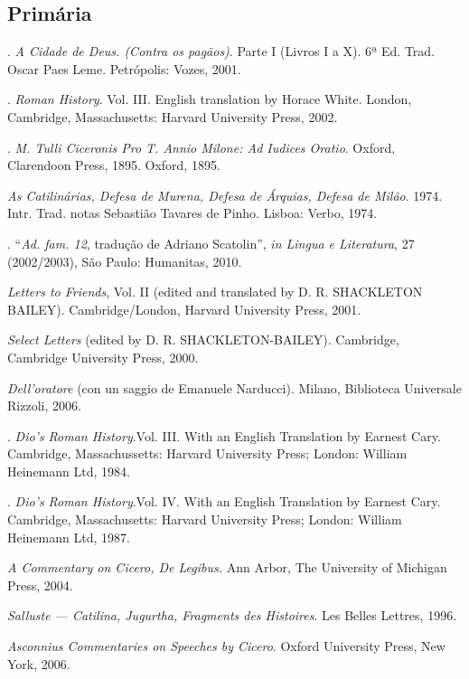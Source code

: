 \begin{bibliohedra}

\section{Primária}

. \emph{A Cidade de Deus. (Contra os pagãos)}. Parte I (Livros I a X). 6ª Ed. Trad. Oscar Paes Leme. Petrópolis: Vozes, 2001.

. \emph{Roman History}. Vol. III. English translation by Horace White. London, Cambridge, Massachusetts: Harvard University Press, 2002.

. \emph{M. Tulli Ciceronis Pro T. Annio Milone: Ad Iudices Oratio}. Oxford, Clarendoon Press, 1895. Oxford, 1895.


 \emph{As Catilinárias, Defesa de Murena, Defesa de Árquias, Defesa de Milão}. 1974. Intr. Trad. notas Sebastião Tavares de Pinho. Lisboa: Verbo, 1974.

. ``\emph{Ad. fam. 12}, tradução de Adriano Scatolin'', \emph{in Lingua e Literatura}, 27 (2002/2003), São Paulo: Humanitas, 2010.

 \emph{Letters to Friends}, Vol. II (edited and translated by D. R. SHACKLETON BAILEY). Cambridge/London, Harvard University Press, 2001.

 \emph{Select Letters} (edited by D. R. SHACKLETON-BAILEY). Cambridge, Cambridge University Press, 2000.

 \emph{Dell’oratore} (con un saggio de Emanuele Narducci). Milano, Biblioteca Universale Rizzoli, 2006.

.  \emph{Dio’s Roman History}.Vol. III. With an English Translation by Earnest Cary.  Cambridge, Massachussetts: Harvard University Press; London: William Heinemann Ltd, 1984. 

.   \emph{Dio’s Roman History}.Vol. IV. With an English Translation by Earnest Cary.  Cambridge, Massachusetts: Harvard University Press; London: William Heinemann Ltd, 1987. 

 \emph{A Commentary on Cicero, \emph{De Legibus}.} Ann Arbor, The University of Michigan Press, 2004.


 \emph{Salluste --- Catilina, Jugurtha, Fragments des Histoires}. Les Belles Lettres, 1996.

 \emph{Asconnius Commentaries on Speeches by Cicero}. Oxford University Press, New York, 2006.



\end{bibliohedra}
